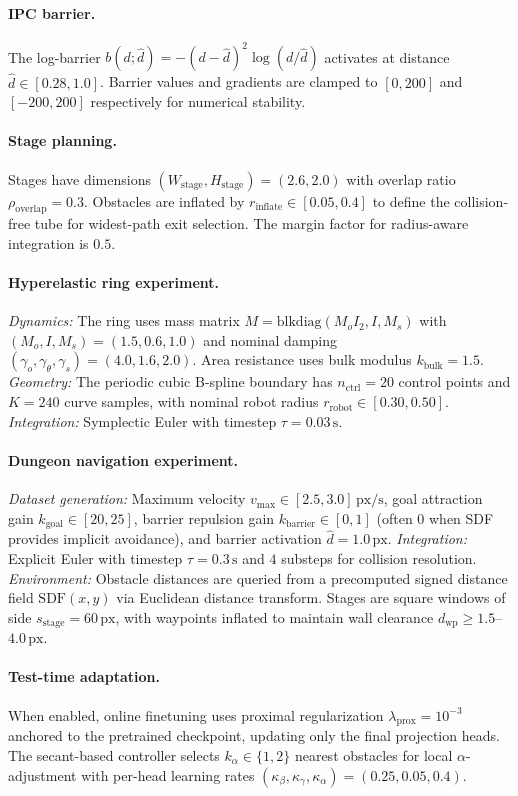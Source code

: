 \paragraph{IPC barrier.}
The log-barrier $b(d; \hat{d}) = -(d - \hat{d})^2 \log(d/\hat{d})$ activates at distance $\hat{d} \in [0.28, 1.0]$. Barrier values and gradients are clamped to $[0, 200]$ and $[-200, 200]$ respectively for numerical stability.

\paragraph{Stage planning.}
Stages have dimensions $(W_{\mathrm{stage}}, H_{\mathrm{stage}}) = (2.6, 2.0)$ with overlap ratio $\rho_{\mathrm{overlap}} = 0.3$. Obstacles are inflated by $r_{\mathrm{inflate}} \in [0.05, 0.4]$ to define the collision-free tube for widest-path exit selection. The margin factor for radius-aware integration is $0.5$.

\paragraph{Hyperelastic ring experiment.}
\emph{Dynamics:} The ring uses mass matrix $M = \mathrm{blkdiag}(M_o I_2, I, M_s)$ with $(M_o, I, M_s) = (1.5, 0.6, 1.0)$ and nominal damping $(\gamma_o, \gamma_\theta, \gamma_s) = (4.0, 1.6, 2.0)$. Area resistance uses bulk modulus $k_{\mathrm{bulk}} = 1.5$. 
\emph{Geometry:} The periodic cubic B-spline boundary has $n_{\mathrm{ctrl}} = 20$ control points and $K = 240$ curve samples, with nominal robot radius $r_{\mathrm{robot}} \in [0.30, 0.50]$.
\emph{Integration:} Symplectic Euler with timestep $\tau = 0.03\,\mathrm{s}$.

\paragraph{Dungeon navigation experiment.}
\emph{Dataset generation:} Maximum velocity $v_{\max} \in [2.5, 3.0]\,\mathrm{px/s}$, goal attraction gain $k_{\mathrm{goal}} \in [20, 25]$, barrier repulsion gain $k_{\mathrm{barrier}} \in [0, 1]$ (often $0$ when SDF provides implicit avoidance), and barrier activation $\hat{d} = 1.0\,\mathrm{px}$.
\emph{Integration:} Explicit Euler with timestep $\tau = 0.3\,\mathrm{s}$ and $4$ substeps for collision resolution.
\emph{Environment:} Obstacle distances are queried from a precomputed signed distance field $\mathrm{SDF}(x,y)$ via Euclidean distance transform. Stages are square windows of side $s_{\mathrm{stage}} = 60\,\mathrm{px}$, with waypoints inflated to maintain wall clearance $d_{\mathrm{wp}} \geq 1.5$--$4.0\,\mathrm{px}$.

\paragraph{Test-time adaptation.}
When enabled, online finetuning uses proximal regularization $\lambda_{\mathrm{prox}} = 10^{-3}$ anchored to the pretrained checkpoint, updating only the final projection heads. The secant-based controller selects $k_\alpha \in \{1, 2\}$ nearest obstacles for local $\alpha$-adjustment with per-head learning rates $(\kappa_\beta, \kappa_\gamma, \kappa_\alpha) = (0.25, 0.05, 0.4)$.

